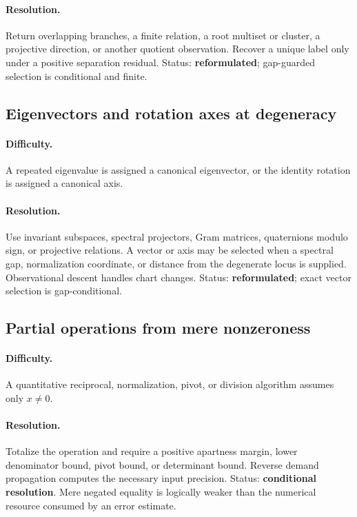 \paragraph{Resolution.}
Return overlapping branches, a finite relation, a root multiset or cluster, a projective direction, or another quotient observation.  Recover a unique label only under a positive separation residual.  Status: \textbf{reformulated}; gap-guarded selection is conditional and finite.

\subsection{Eigenvectors and rotation axes at degeneracy}

\paragraph{Difficulty.}
A repeated eigenvalue is assigned a canonical eigenvector, or the identity rotation is assigned a canonical axis.

\paragraph{Resolution.}
Use invariant subspaces, spectral projectors, Gram matrices, quaternions modulo sign, or projective relations.  A vector or axis may be selected when a spectral gap, normalization coordinate, or distance from the degenerate locus is supplied.  Observational descent handles chart changes.  Status: \textbf{reformulated}; exact vector selection is gap-conditional.

\subsection{Partial operations from mere nonzeroness}

\paragraph{Difficulty.}
A quantitative reciprocal, normalization, pivot, or division algorithm assumes only \(x\neq0\).

\paragraph{Resolution.}
Totalize the operation and require a positive apartness margin, lower denominator bound, pivot bound, or determinant bound.  Reverse demand propagation computes the necessary input precision.  Status: \textbf{conditional resolution}.  Mere negated equality is logically weaker than the numerical resource consumed by an error estimate.

